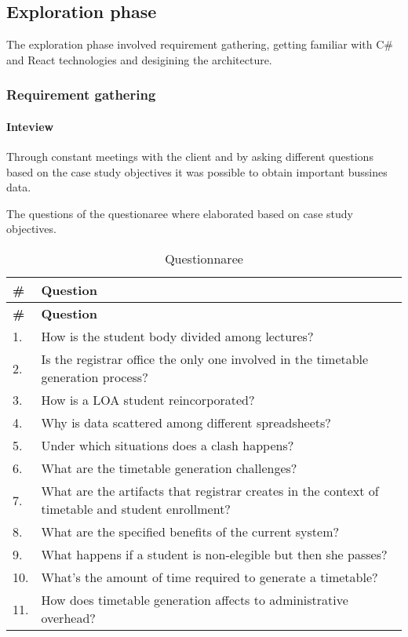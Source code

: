\subsection{Exploration phase}
The exploration phase involved requirement gathering, getting familiar with C\# and React technologies and desigining the architecture.

\subsubsection{Requirement gathering}
\paragraph{Inteview} Through constant meetings with the client and by asking different questions based on the case study objectives it was possible to obtain important bussines data.

The questions of the questionaree where elaborated based on case study objectives.
\begin{longtable}{l|l}
\caption{Questionnaree} \label{tab:strategicDependencies} \\

\textbf{\#} &  \textbf{Question}\\
\hline
\endfirsthead
\textbf{\#} &  \textbf{Question}\\
\hline
\endhead
\endfoot

1. & How is the student body divided among lectures? \\
2. & Is the registrar office the only one involved in the timetable generation process?\\
3. & How is a LOA student reincorporated?\\
4. & Why is data scattered among different spreadsheets?\\
5. & Under which situations does a clash happens?\\
6. & What are the timetable generation challenges?\\
7. & What are the artifacts that registrar creates in the context of timetable and student enrollment?\\
8. & What are the specified benefits of the current system?\\
9. & What happens if a student is non-elegible but then she passes?\\
10. & What's the amount of time required to generate a timetable?\\
11. & How does timetable generation affects to administrative overhead?\\

\end{longtable}

